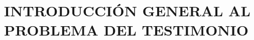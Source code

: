 \documentclass[../main.tex]{subfiles}
\begin{document}
\setcounter{chapter}{0}

\chapter{INTRODUCCIÓN GENERAL AL PROBLEMA DEL TESTIMONIO}

%

%

%


%




%
\end{document}
